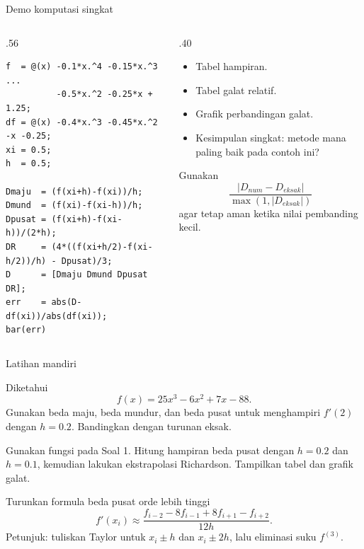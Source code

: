 \documentclass[aspectratio=169,10pt]{beamer}
\begin{document}
\begin{frame}[fragile]{Demo komputasi singkat}
\scriptsize
\begin{columns}[T,totalwidth=\textwidth]
\begin{column}{.56\textwidth}
\begin{bluebox}
\begin{verbatim}
f  = @(x) -0.1*x.^4 -0.15*x.^3 ...
          -0.5*x.^2 -0.25*x + 1.25;
df = @(x) -0.4*x.^3 -0.45*x.^2 -x -0.25;
xi = 0.5;
h  = 0.5;

Dmaju  = (f(xi+h)-f(xi))/h;
Dmund  = (f(xi)-f(xi-h))/h;
Dpusat = (f(xi+h)-f(xi-h))/(2*h);
DR     = (4*((f(xi+h/2)-f(xi-h/2))/h) - Dpusat)/3;
D      = [Dmaju Dmund Dpusat DR];
err    = abs(D-df(xi))/abs(df(xi));
bar(err)
\end{verbatim}
\end{bluebox}
\end{column}
\begin{column}{.40\textwidth}
\begin{orangebox}
\begin{itemize}\setlength\itemsep{2pt}
\item Tabel hampiran.
\item Tabel galat relatif.
\item Grafik perbandingan galat.
\item Kesimpulan singkat: metode mana paling baik pada contoh ini?
\end{itemize}
\end{orangebox}
\begin{greenbox}[Catatan]
Gunakan 
\[
\frac{|D_{num}-D_{eksak}|}{\max(1,|D_{eksak}|)}
\]
agar tetap aman ketika nilai pembanding kecil.
\end{greenbox}
\end{column}
\end{columns}
\end{frame}

\begin{frame}{Latihan mandiri}
\scriptsize
\begin{orangebox}[Soal 1]
Diketahui
\[
f(x)=25x^3-6x^2+7x-88.
\]
Gunakan beda maju, beda mundur, dan beda pusat untuk menghampiri $f'(2)$ dengan $h=0.2$.
Bandingkan dengan turunan eksak.
\end{orangebox}
\begin{greenbox}[Soal 2]
Gunakan fungsi pada Soal 1. Hitung hampiran beda pusat dengan $h=0.2$ dan $h=0.1$, kemudian lakukan ekstrapolasi Richardson.
Tampilkan tabel dan grafik galat.
\end{greenbox}
\begin{purplebox}[Soal 3]
Turunkan formula beda pusat orde lebih tinggi
\[
f'(x_i)\approx\frac{f_{i-2}-8f_{i-1}+8f_{i+1}-f_{i+2}}{12h}.
\]
Petunjuk: tuliskan Taylor untuk $x_i\pm h$ dan $x_i\pm2h$, lalu eliminasi suku $f^{(3)}$.
\end{purplebox}
\end{frame}
\end{document}
